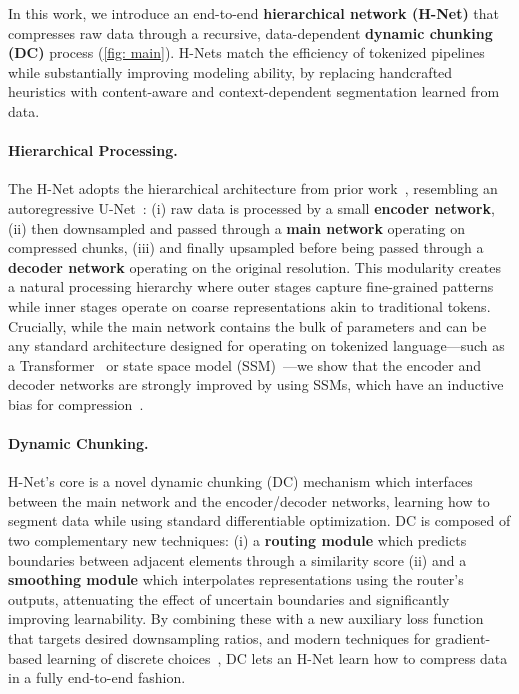 \documentclass{article}
\newcommand{\citep}{\parencite}
\newcommand{\encoder}{encoder network}
\newcommand{\main}{main network}
\newcommand{\decoder}{decoder network}
\theoremstyle{plain}
\theoremstyle{remark}
\begin{document}
In this work, we introduce an end-to-end \textbf{hierarchical network (H-Net)} that compresses raw data through a recursive, data-dependent \textbf{dynamic chunking (DC)} process (\cref{fig: main}).
H-Nets match the efficiency of tokenized pipelines while substantially improving modeling ability,
by replacing handcrafted heuristics with content-aware and context-dependent segmentation learned from data.

\paragraph{Hierarchical Processing.}
The H-Net adopts the hierarchical architecture from prior work~\citep{SaShiMi,HourglassTransformer,SpaceByte}, resembling an autoregressive U-Net~\citep{U-Net}: (i) raw data is processed by a small \textbf{\encoder{}}, (ii) then downsampled and passed through a \textbf{\main{}} operating on compressed chunks, (iii) and finally upsampled before being passed through a \textbf{\decoder{}} operating on the original resolution.
This modularity creates a natural processing hierarchy where outer stages capture fine-grained patterns while inner stages operate on coarse representations akin to traditional tokens.
Crucially, while the main network contains the bulk of parameters and can be any standard architecture designed for operating on tokenized language---such as a Transformer~\citep{Transformer} or state space model (SSM)~\citep{Mamba}---we show that the encoder and decoder networks are strongly improved by using SSMs, which have an inductive bias for compression~\citep{gu2025tradeoffs}.

\paragraph{Dynamic Chunking.}
H-Net's core is a novel dynamic chunking (DC) mechanism which interfaces between the main network and the encoder/decoder networks, learning how to segment data while using standard differentiable optimization.
DC is composed of two complementary new techniques: (i) a \textbf{routing module} which predicts boundaries between adjacent elements through a similarity score (ii) and a \textbf{smoothing module} which interpolates representations using the router's outputs, attenuating the effect of uncertain boundaries and significantly improving learnability.
By combining these with a new auxiliary loss function that targets desired downsampling ratios, and modern techniques for gradient-based learning of discrete choices~\citep{MoE,STE},
DC lets an H-Net learn how to compress data in a fully end-to-end fashion.
\end{document}

